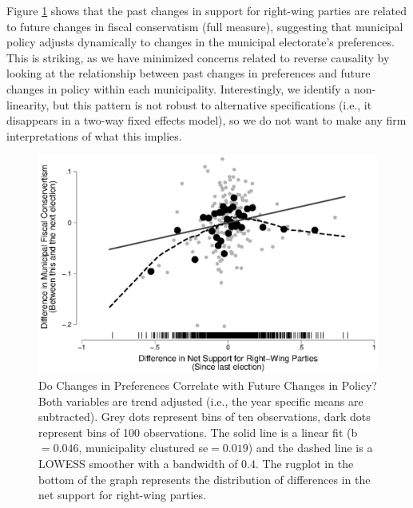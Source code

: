 \documentclass[a4paper,12pt]{article}
\begin{document}
Figure \ref{fig:scatter} shows that the past changes in support for right-wing parties are related to future changes in fiscal conservatism (full measure), suggesting that municipal policy adjusts dynamically to changes in the municipal electorate's preferences. This is striking, as we have minimized concerns related to reverse causality by looking at the relationship between past changes in preferences and future changes in policy within each municipality. Interestingly, we identify a non-linearity, but this pattern is not robust to alternative specifications (i.e., it disappears in a two-way fixed effects model), so we do not want to make any firm interpretations of what this implies.


\begin{figure}[h]
	\centering
	\includegraphics[scale = 0.8]{scatterplot.eps}
	\caption{Do Changes in Preferences Correlate with Future Changes in Policy? Both variables are trend adjusted (i.e., the year specific means are subtracted). Grey dots represent bins of ten observations, dark dots represent bins of 100  observations. The solid line is a linear fit (b$=0.046$, municipality clustured se$=0.019$) and the dashed line is a LOWESS smoother with a bandwidth of 0.4. The rugplot in the bottom of the graph represents the distribution of differences in the net support for right-wing parties. }
	\label{fig:scatter}
\end{figure}
\end{document}
